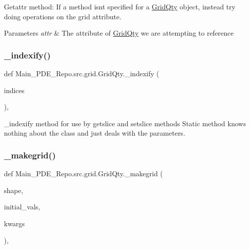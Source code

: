 Getattr method\+: If a method isn\textquotesingle{}t specified for a \hyperlink{classMain__PDE__Repo_1_1src_1_1grid_1_1GridQty}{Grid\+Qty} object, instead try doing operations on the grid attribute. 


\begin{DoxyParams}{Parameters}
{\em attr} & The attribute of \hyperlink{classMain__PDE__Repo_1_1src_1_1grid_1_1GridQty}{Grid\+Qty} we are attempting to reference \\
\hline
\end{DoxyParams}
\mbox{\label{classMain__PDE__Repo_1_1src_1_1grid_1_1GridQty_a048ff999254cfe9420fd377a6edc289b}} 
\subsubsection{\texorpdfstring{\+\_\+indexify()}{\_indexify()}}
{\footnotesize\ttfamily def Main\+\_\+\+P\+D\+E\+\_\+\+Repo.\+src.\+grid.\+Grid\+Qty.\+\_\+indexify (\begin{DoxyParamCaption}\item[{}]{indices }\end{DoxyParamCaption})\hspace{0.3cm}{\ttfamily [static]}, {\ttfamily [private]}}



\+\_\+indexify method for use by getslice and setslice methods Static method knows nothing about the class and just deals with the parameters. 

\mbox{\label{classMain__PDE__Repo_1_1src_1_1grid_1_1GridQty_af7f9a9ebb90e4911e7292e721f7d1de9}} 
\subsubsection{\texorpdfstring{\+\_\+makegrid()}{\_makegrid()}}
{\footnotesize\ttfamily def Main\+\_\+\+P\+D\+E\+\_\+\+Repo.\+src.\+grid.\+Grid\+Qty.\+\_\+makegrid (\begin{DoxyParamCaption}\item[{}]{shape,  }\item[{}]{initial\+\_\+vals,  }\item[{}]{kwargs }\end{DoxyParamCaption})\hspace{0.3cm}{\ttfamily [static]}, {\ttfamily [private]}}



